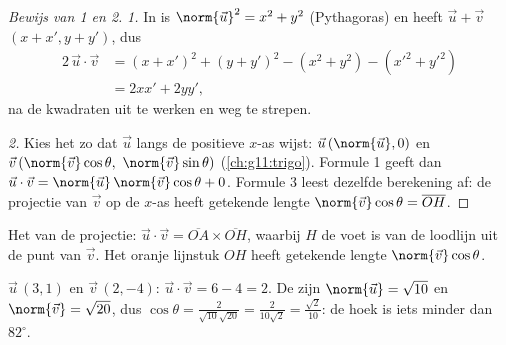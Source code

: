 \begin{proof}[Bewijs van 1 en 2]
\emph{1.} In  is $\norm{\vec u}^2 = x^2 + y^2$ (Pythagoras) en
heeft $\vec u + \vec v$  $(x + x', y + y')$, dus
\begin{align*}
2\,\vec u \cdot \vec v
&= (x + x')^2 + (y + y')^2 - (x^2 + y^2) - (x'^2 + y'^2)\\
&= 2xx' + 2yy',
\end{align*}
na de kwadraten uit te werken en weg te strepen.

\emph{2.} Kies het  zo dat $\vec u$ langs de positieve $x$-as
wijst: $\vec u\,(\norm{\vec u}, 0)$ en
$\vec v\,(\norm{\vec v}\cos\theta,\ \norm{\vec v}\sin\theta)$
(\cref{ch:g11:trigo}). Formule 1 geeft dan
$\vec u \cdot \vec v = \norm{\vec u}\,\norm{\vec v}\cos\theta + 0$. Formule
3 leest dezelfde berekening af: de projectie van $\vec v$ op de $x$-as heeft
getekende lengte $\norm{\vec v}\cos\theta = \overline{OH}$.
\end{proof}

\begin{omfigure}

{\small Het  van de projectie:
$\vec u \cdot \vec v = \overline{OA} \times \overline{OH}$, waarbij $H$ de
voet is van de loodlijn uit de punt van $\vec v$. Het oranje lijnstuk $OH$
heeft getekende lengte $\norm{\vec v}\cos\theta$.}
\end{omfigure}

\begin{example}\label{ex:g11:scal:compute}
$\vec u\,(3, 1)$ en $\vec v\,(2, -4)$: $\vec u \cdot \vec v = 6 - 4 = 2$. De
 zijn $\norm{\vec u} = \sqrt{10}$ en $\norm{\vec v} = \sqrt{20}$, dus
$\cos\theta = \frac{2}{\sqrt{10}\sqrt{20}} = \frac{2}{10\sqrt2}
= \frac{\sqrt2}{10}$: de hoek is iets minder dan $82^\circ$.
\end{example}

